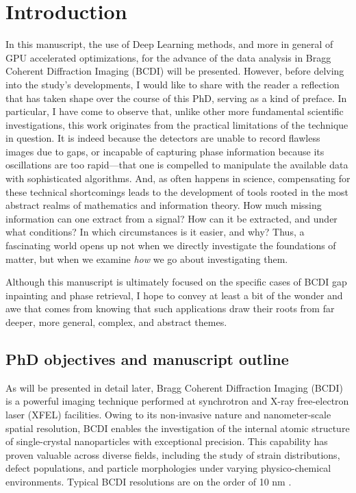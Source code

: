 \section{Introduction}\label{chp:intro}

In this manuscript, the use of Deep Learning methods, and more in general of GPU accelerated optimizations, for the advance of 
the data analysis in Bragg Coherent Diffraction Imaging (BCDI) will be presented. However, before delving into the 
study’s developments, I would like to share with the reader a reflection that has taken shape over the course of this 
PhD, serving as a kind of preface. In particular, I have come to observe that, unlike other more fundamental 
scientific investigations, this work originates from the practical limitations of the technique in question. 
It is indeed because the detectors are unable to record flawless images due to gaps, or incapable of 
capturing phase information because its oscillations are too rapid—that one is compelled to manipulate the available 
data with sophisticated algorithms. And, as often happens in science, compensating for these technical shortcomings 
leads to the development of tools rooted in the most abstract realms of mathematics and information theory. How much 
missing information can one extract from a signal? How can it be extracted, and under what conditions? In which 
circumstances is it easier, and why? Thus, a fascinating world opens up not when we directly investigate the foundations 
of matter, but when we examine \textit{how} we go about investigating them. 

Although this manuscript is ultimately focused on the specific cases of BCDI gap inpainting and phase retrieval, 
I hope to convey at least a bit of the wonder and awe that comes from knowing that such applications draw their roots 
from far deeper, more general, complex, and abstract themes.

\subsection{PhD objectives and manuscript outline}

As will be presented in detail later, Bragg Coherent Diffraction Imaging (BCDI) is a powerful imaging technique performed 
at synchrotron and X-ray free-electron laser (XFEL) facilities. Owing to its non-invasive nature and nanometer-scale 
spatial resolution, BCDI enables the investigation of the internal atomic structure of single-crystal nanoparticles 
with exceptional precision. This capability has proven valuable across diverse fields, including the study of strain 
distributions, defect populations, and particle morphologies under varying physico-chemical environments. Typical BCDI 
resolutions are on the order of 10 nm \cite{BCDI_review2024}.

